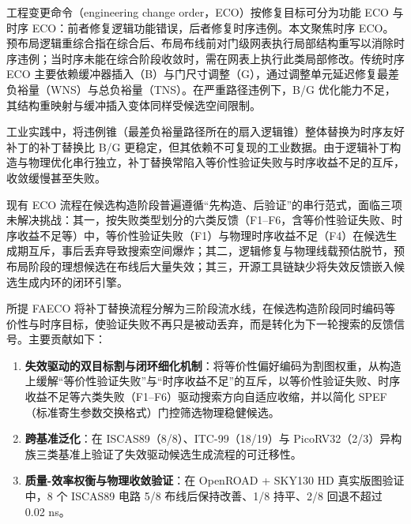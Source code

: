 \documentclass[twocolumn,10pt]{ctexart}
\begin{document}
工程变更命令（engineering change order，ECO）按修复目标可分为功能 ECO 与时序 ECO：前者修复逻辑功能错误，后者修复时序违例。本文聚焦时序 ECO。预布局逻辑重综合指在综合后、布局布线前对门级网表执行局部结构重写以消除时序违例；当时序未能在综合阶段收敛时，需在网表上执行此类局部修改。传统时序 ECO 主要依赖缓冲器插入（B）与门尺寸调整（G），通过调整单元延迟修复最差负裕量（WNS）与总负裕量（TNS）。在严重路径违例下，B/G 优化能力不足，其结构重映射与缓冲插入变体同样受候选空间限制\cite{chen2012metal,chen2012fixability,liang2012buffer,ho2010eco}。

工业实践中，将违例锥（最差负裕量路径所在的扇入逻辑锥）整体替换为时序友好补丁的补丁替换比 B/G 更稳定，但其依赖不可复现的工业数据。由于逻辑补丁构造与物理优化串行独立，补丁替换常陷入等价性验证失败与时序收益不足的互斥，收敛缓慢甚至失败。

现有 ECO 流程在候选构造阶段普遍遵循“先构造、后验证”的串行范式，面临三项未解决挑战：其一，按失败类型划分的六类反馈（F1--F6，含等价性验证失败、时序收益不足等）中，等价性验证失败（F1）与物理时序收益不足（F4）在候选生成期互斥，事后丢弃导致搜索空间爆炸；其二，逻辑修复与物理线载预估脱节，预布局阶段的理想候选在布线后大量失效；其三，开源工具链缺少将失效反馈嵌入候选生成内环的闭环引擎。

所提 FAECO 将补丁替换流程分解为三阶段流水线，在候选构造阶段同时编码等价性与时序目标，使验证失败不再只是被动丢弃，而是转化为下一轮搜索的反馈信号。主要贡献如下：

\begin{enumerate}
  \item \textbf{失效驱动的双目标割与闭环细化机制}：将等价性偏好编码为割图权重，从构造上缓解“等价性验证失败”与“时序收益不足”的互斥，以等价性验证失败、时序收益不足等六类失败（F1--F6）驱动搜索方向自适应收缩，并以简化 SPEF（标准寄生参数交换格式）门控筛选物理稳健候选。
\item \textbf{跨基准泛化}：在 ISCAS89\cite{iscas89}（8/8）、ITC-99\cite{itc99}（18/19）与 PicoRV32\cite{picorv32}（2/3）异构族三类基准上验证了失效驱动候选生成流程的可迁移性。
\item \textbf{质量-效率权衡与物理收敛验证}：在 OpenROAD\cite{openroad} + SKY130 HD\cite{sky130} 真实版图验证中，8 个 ISCAS89 电路 5/8 布线后保持改善、1/8 持平、2/8 回退不超过 0.02 ns。
\end{enumerate}

\end{document}
